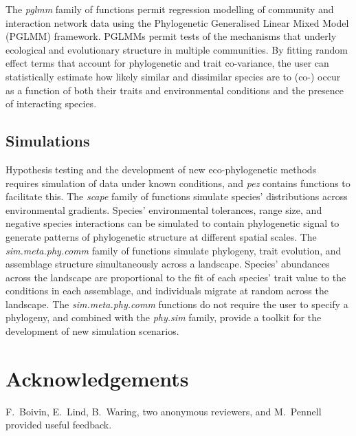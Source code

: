\documentclass{bioinfo}
\begin{document}
The \emph{pglmm} family of functions permit regression modelling of
community \citep{Ives2011} and interaction network data
\citep{Rafferty2013} using the Phylogenetic Generalised Linear Mixed
Model (PGLMM) framework. PGLMMs permit tests of the mechanisms that
underly ecological and evolutionary structure in multiple
communities. By fitting random effect terms that account for
phylogenetic and trait co-variance, the user can statistically
estimate how likely similar and dissimilar species are to (co-) occur
as a function of both their traits and environmental conditions and
the presence of interacting species.
\subsection{Simulations}
Hypothesis testing and the development of new eco-phylogenetic methods
requires simulation of data under known conditions, and \emph{pez}
contains functions to facilitate this. The \emph{scape} family of
functions \citep[following][]{Helmus2012} simulate species'
distributions across environmental gradients. Species' environmental
tolerances, range size, and negative species interactions can be
simulated to contain phylogenetic signal to generate patterns of
phylogenetic structure at different spatial scales. The
\emph{sim.meta.phy.comm} family of functions simulate phylogeny, trait
evolution, and assemblage structure simultaneously across a landscape.
Species' abundances across the landscape are proportional to the fit
of each species' trait value to the conditions in each assemblage, and
individuals migrate at random across the landscape. The
\emph{sim.meta.phy.comm} functions do not require the user to specify
a phylogeny, and combined with the \emph{phy.sim} family, provide a
toolkit for the development of new simulation scenarios.
\section*{Acknowledgements}
F.\ Boivin, E.\ Lind, B.\ Waring, two anonymous reviewers, and M.\
Pennell provided useful feedback.
\end{document}
